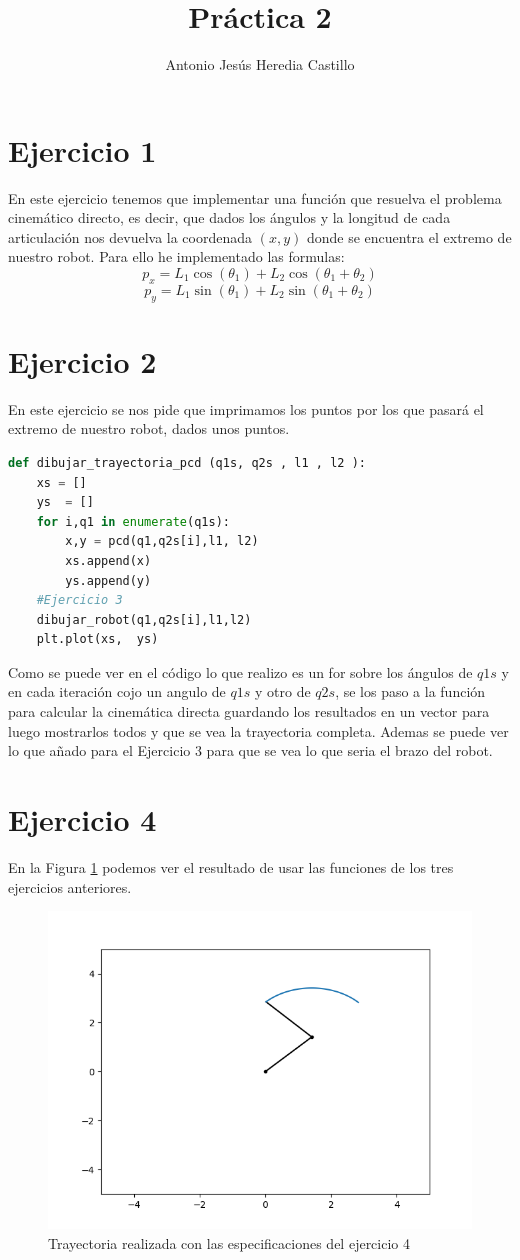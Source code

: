 \documentclass[12pt,a4paper]{report}
\title{Práctica 2}
\author{Antonio Jesús Heredia Castillo}
\begin{document}
\maketitle

\section*{Ejercicio 1}
En este ejercicio tenemos que implementar una función que resuelva el problema cinemático directo, es decir, que dados los ángulos y la longitud de cada articulación nos devuelva la coordenada $(x,y)$ donde se encuentra el extremo de nuestro robot. Para ello he implementado las formulas:
$$p_x = L_1\cos(\theta_1) + L_2\cos(\theta_1+\theta_2)$$
$$p_y = L_1\sin(\theta_1) + L_2\sin(\theta_1+\theta_2)$$

\section*{Ejercicio 2}
En este ejercicio se nos pide que imprimamos los puntos por los que pasará el extremo de nuestro robot, dados unos puntos.
\begin{lstlisting}[language=Python]
def dibujar_trayectoria_pcd (q1s, q2s , l1 , l2 ):
	xs = []
	ys  = []
	for i,q1 in enumerate(q1s):
		x,y = pcd(q1,q2s[i],l1, l2)
		xs.append(x)
		ys.append(y)
	#Ejercicio 3
	dibujar_robot(q1,q2s[i],l1,l2)
	plt.plot(xs,  ys)
\end{lstlisting}
Como se puede ver en el código lo que realizo es un for sobre los ángulos de $q1s$ y en cada iteración cojo un angulo de $q1s$ y otro de $q2s$, se los paso a la función para calcular la cinemática directa guardando los resultados en un vector para luego mostrarlos todos y que se vea la trayectoria completa. Ademas se puede ver lo que añado para el Ejercicio 3 para que se vea lo que seria el brazo del robot. 
\section*{Ejercicio 4}
En la Figura \ref{fig:ej4} podemos ver el resultado de usar las funciones de los tres ejercicios anteriores.
\begin{figure}[H]
	\centering
	\includegraphics[width=0.7\linewidth]{img/ej4}
	\caption{Trayectoria realizada con las especificaciones del ejercicio 4}
	\label{fig:ej4}
\end{figure}
\end{document}
